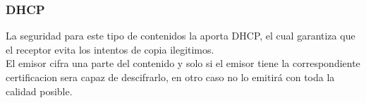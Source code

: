 \begin{frame}
  \frametitle{DHCP}
  La seguridad para este tipo de contenidos la aporta DHCP, el cual garantiza que el receptor evita los intentos de copia ilegitimos.\\
  El emisor cifra una parte del contenido y solo si el emisor tiene la correspondiente certificacion sera capaz de descifrarlo, en otro caso no lo emitirá con toda la calidad posible.
\end{frame}
